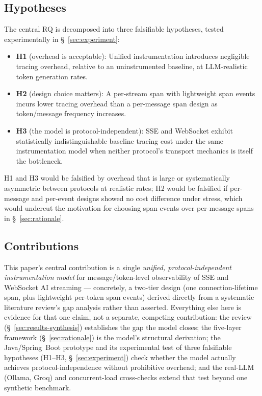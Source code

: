 \documentclass[11pt]{article}
\begin{document}
\subsection{Hypotheses}
\label{sec:hypotheses}
The central RQ is decomposed into three falsifiable hypotheses, tested experimentally in \S~\ref{sec:experiment}:
\begin{itemize}
\item \textbf{H1} (overhead is acceptable): Unified instrumentation introduces negligible tracing overhead, relative to an uninstrumented baseline, at LLM-realistic token generation rates.
\item \textbf{H2} (design choice matters): A per-stream span with lightweight span events incurs lower tracing overhead than a per-message span design as token/message frequency increases.
\item \textbf{H3} (the model is protocol-independent): SSE and WebSocket exhibit statistically indistinguishable baseline tracing cost under the same instrumentation model when neither protocol's transport mechanics is itself the bottleneck.
\end{itemize}
H1 and H3 would be falsified by overhead that is large or systematically asymmetric between protocols at realistic rates; H2 would be falsified if per-message and per-event designs showed no cost difference under stress, which would undercut the motivation for choosing span events over per-message spans in \S~\ref{sec:rationale}.

\subsection{Contributions}
This paper's central contribution is a single \emph{unified, protocol-independent instrumentation model} for message/token-level observability of SSE and WebSocket AI streaming --- concretely, a two-tier design (one connection-lifetime span, plus lightweight per-token span events) derived directly from a systematic literature review's gap analysis rather than asserted. Everything else here is evidence for that one claim, not a separate, competing contribution: the review (\S~\ref{sec:results-synthesis}) establishes the gap the model closes; the five-layer framework (\S~\ref{sec:rationale}) is the model's structural derivation; the Java/Spring~Boot prototype and its experimental test of three falsifiable hypotheses (H1--H3, \S~\ref{sec:experiment}) check whether the model actually achieves protocol-independence without prohibitive overhead; and the real-LLM (Ollama, Groq) and concurrent-load cross-checks extend that test beyond one synthetic benchmark.
\end{document}
